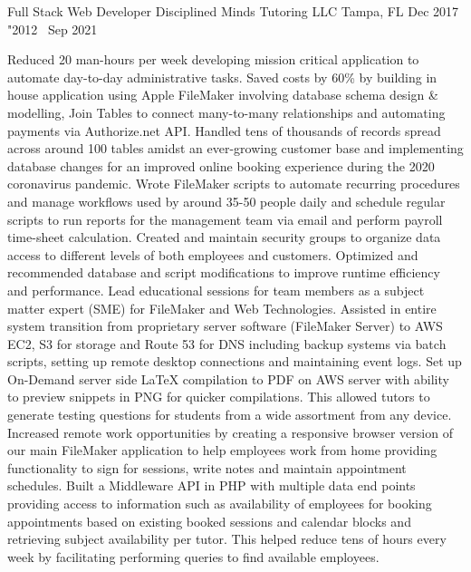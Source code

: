 \documentclass{resume}
\begin{document}
\jobInfoLocationDate
  {Full Stack Web Developer}
  {Disciplined Minds Tutoring LLC}
  {Tampa, FL}
  {Dec 2017 \char"2012  \ Sep 2021}

\begin{itemize}
\li Reduced 20 man-hours per week developing mission critical application to automate day-to-day administrative tasks.
\li Saved costs by 60\% by building in house application using Apple FileMaker involving database schema design \& modelling, Join Tables to connect many-to-many relationships and automating payments via Authorize.net API.
\li Handled tens of thousands of records spread across around 100 tables amidst an ever-growing customer base and implementing database changes for an improved online booking experience during the 2020 coronavirus pandemic.
\li Wrote FileMaker scripts to automate recurring procedures and manage workflows used by around 35-50 people daily and schedule regular scripts to run reports for the management team via email and perform payroll time-sheet calculation.
\li Created and maintain security groups to organize data access to different levels of both employees and customers.
\li Optimized and recommended database and script modifications to improve runtime efficiency and performance.
\li Lead educational sessions for team members as a subject matter expert (SME) for FileMaker and Web Technologies.
\li Assisted in entire system transition from proprietary server software (FileMaker Server) to AWS EC2, S3 for storage and Route 53 for DNS including backup systems via batch scripts, setting up remote desktop connections and maintaining event logs.
\li Set up On-Demand server side LaTeX compilation to PDF on AWS server with ability to preview snippets in PNG for quicker compilations. This allowed tutors to generate testing questions for students from a wide assortment from any device.
\li Increased remote work opportunities by creating a responsive browser version of our main FileMaker application to help employees work from home providing functionality to sign for sessions, write notes and maintain appointment schedules.
\li Built a Middleware API in PHP with multiple data end points providing access to information such as availability of employees for booking appointments based on existing booked sessions and calendar blocks and retrieving subject availability per tutor. This helped reduce tens of hours every week by facilitating performing queries to find available employees.

\end{itemize}
\end{document}
